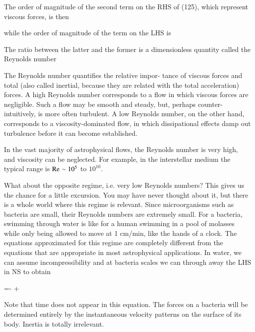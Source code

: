 The order of magnitude of the second term on the RHS of (125), which
represent viscous forces, is then

\beq
{}
\eeq

\noindent while the order of magnitude of the term on the LHS is

\beq
{}
\eeq


The ratio between the latter and the former is a dimensionless quantity
called the Reynolds number

\beq
{}
\eeq

The Reynolds number quantifies the relative impor-
tance of viscous forces and total (also called inertial, because they are
related with the total acceleration) forces.
A high Reynolds number corresponds to a flow in which viscous forces
are negligible. Such a flow may be smooth and steady, but, perhaps
counter-intuitively, is more often turbulent. A low Reynolds number, on the other hand,
corresponds to a viscosity-dominated flow, in which dissipational eﬀects
damp out turbulence before it can become established.

In the vast majority of astrophysical flows, the Reynolds number is
very high, and viscosity can be neglected. For example, in the
interstellar medium the typical range is ${\rm Re} \sim 10^5$ to $10^{10}$.


What about the opposite regime, i.e. very low Reynolds numbers?
This gives us the chance for a little excursion. You may have never thought
about it, but there is a whole world where this regime is relevant. Since
microorganisms such as bacteria are small, their Reynolds numbers are
extremely small. For a bacteria, swimming through water is like for a human swimming in a pool of molasses while only being allowed to move at
1 cm/min, like the hands of a clock. The equations approximated for this
regime are completely diﬀerent from the equations that are appropriate
in most astrophysical applications. In water, we can assume incompressibility and at bacteria scales we can through away the LHS in NS 
to obtain

=- + \eta{}
\eeq

Note that time does not appear in this equation. The forces on a bacteria
will be determined entirely by the instantaneous velocity patterns on the
surface of its body. Inertia is totally irrelevant. \\



